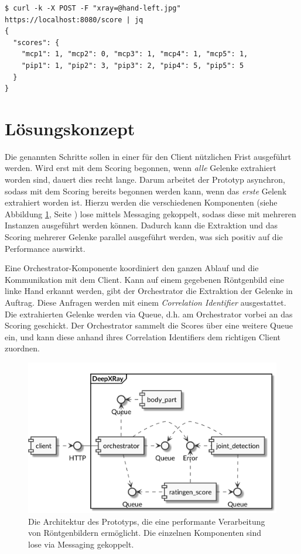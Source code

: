 \documentclass[a4paper,10pt,hidelinks]{scrartcl}
\newcommand{\imgref}[1]{{Abbildung \ref{#1}, Seite \pageref{#1}}}
\begin{document}
\begin{lstlisting}
$ curl -k -X POST -F "xray=@hand-left.jpg" https://localhost:8080/score | jq
{
  "scores": {
    "mcp1": 1, "mcp2": 0, "mcp3": 1, "mcp4": 1, "mcp5": 1,
    "pip1": 1, "pip2": 3, "pip3": 2, "pip4": 5, "pip5": 5
  }
}
\end{lstlisting}

\section{\fontsize{14}{16}\selectfont Lösungskonzept}

Die genannten Schritte sollen in einer für den Client nützlichen Frist ausgeführt werden. Wird erst mit dem Scoring begonnen, wenn \textit{alle} Gelenke extrahiert worden sind, dauert dies recht lange. Darum arbeitet der Prototyp asynchron, sodass mit dem Scoring bereits begonnen werden kann, wenn das \textit{erste} Gelenk extrahiert worden ist. Hierzu werden die verschiedenen Komponenten (siehe \imgref{fig:architektur}) lose mittels Messaging gekoppelt, sodass diese mit mehreren Instanzen ausgeführt werden können. Dadurch kann die Extraktion und das Scoring mehrerer Gelenke parallel ausgeführt werden, was sich positiv auf die Performance auswirkt.

Eine Orchestrator-Komponente koordiniert den ganzen Ablauf und die Kommunikation mit dem Client. Kann auf einem gegebenen Röntgenbild eine linke Hand erkannt werden, gibt der Orchestrator die Extraktion der Gelenke in Auftrag. Diese Anfragen werden mit einem \textit{Correlation Identifier} ausgestattet. Die extrahierten Gelenke werden via Queue, d.h. am Orchestrator vorbei an das Scoring geschickt. Der Orchestrator sammelt die Scores über eine weitere Queue ein, und kann diese anhand ihres Correlation Identifiers dem richtigen Client zuordnen.

\begin{figure}
    \centering
    \includegraphics[width=0.6\linewidth]{../doc/pics/architektur-variante-queue-2.png}
    \caption{Die Architektur des Prototyps, die eine performante Verarbeitung von Röntgenbildern ermöglicht. Die einzelnen Komponenten sind lose via Messaging gekoppelt.}
    \label{fig:architektur}
\end{figure}
\end{document}
